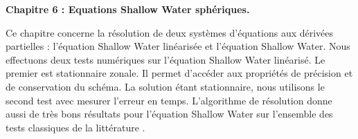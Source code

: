 \vspace{0.7cm}
\textbf{Chapitre 6 : Equations Shallow Water sphériques.}

Ce chapitre concerne la résolution de deux systèmes d'équations aux dérivées partielles :  l'équation Shallow Water linéarisée et l'équation Shallow Water. Nous effectuons deux tests numériques sur l'équation Shallow Water linéarisé. Le premier est stationnaire zonale. Il permet d'accéder aux propriétés de précision et de conservation du schéma. La solution étant stationnaire, nous utilisons le second test avec mesurer l'erreur en temps. L'algorithme de résolution donne aussi de très bons résultats pour l'équation Shallow Water sur l'ensemble des tests classiques de la littérature \cite{Williamson1992, Galewsky2004}.

